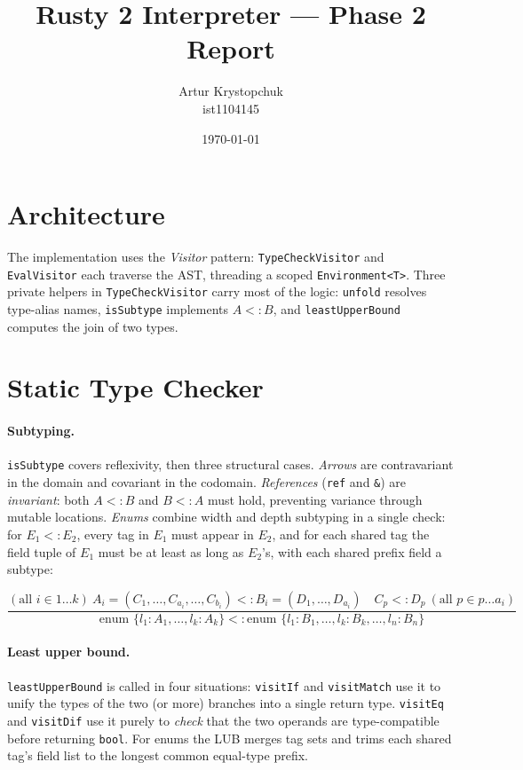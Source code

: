 \documentclass[10pt,a4paper]{article}
\title{\textbf{Rusty 2 Interpreter --- Phase 2 Report}}
\author{Artur Krystopchuk \\ \small ist1104145}
\date{\today}
\begin{document}
\maketitle\vspace{-10pt}

\section{Architecture}

The implementation uses the \emph{Visitor} pattern: \texttt{TypeCheckVisitor} and
\texttt{EvalVisitor} each traverse the AST, threading a scoped \texttt{Environment<T>}.
Three private helpers in \texttt{TypeCheckVisitor} carry most of the logic:
\texttt{unfold} resolves type-alias names, \texttt{isSubtype} implements $A <: B$, and
\texttt{leastUpperBound} computes the join of two types.

\section{Static Type Checker}

\paragraph{Subtyping.}
\texttt{isSubtype} covers reflexivity, then three structural cases.
\emph{Arrows} are contravariant in the domain and covariant in the codomain.
\emph{References} (\texttt{ref} and \texttt{\&}) are \emph{invariant}: both
$A <: B$ and $B <: A$ must hold, preventing variance through mutable
locations.
\emph{Enums} combine width and depth subtyping in a single check: for $E_1 <: E_2$,
every tag in $E_1$ must appear in $E_2$, and for each shared tag the field tuple of
$E_1$ must be at least as long as $E_2$'s, with each shared prefix field a subtype:

$$\frac{(\text{all } i \in 1\dots k) \ A_i = (C_1, \dots, C_{a_i}, \dots, C_{b_i}) <: B_i = (D_1, \dots, D_{a_i}) \quad C_p <: D_p \ (\text{all } p \in p\dots a_i)}{\text{enum } \{l_1 : A_1, \dots, l_k : A_k\} <: \text{enum } \{l_1 : B_1, \dots, l_k : B_k, \dots, l_n : B_n\}}$$


\paragraph{Least upper bound.}
\texttt{leastUpperBound} is called in four situations:
\texttt{visitIf} and \texttt{visitMatch} use it to unify the types of
the two (or more) branches into a single return type.
\texttt{visitEq} and \texttt{visitDif} use it purely to \emph{check}
that the two operands are type-compatible before returning \texttt{bool}.
For enums the LUB merges tag sets and trims each shared tag's field list to the
longest common equal-type prefix.
\end{document}
